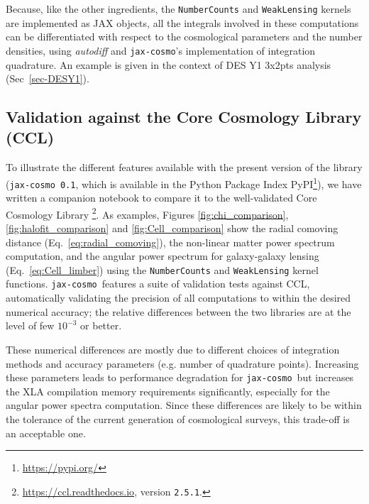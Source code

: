 \documentclass[twocolumn,twocolappendix,nofootinbib,iop]{openjournal}
\newcommand{\nblink}[1]{\href{https://github.com/DifferentiableUniverseInitiative/jax-cosmo-paper/blob/master/notebooks/#1.ipynb}{\faFileCodeO}}
\newcommand{\FrL}[1]{{\color{cyan}FL: #1}}
\newcommand{\jaxcosmo}{\texttt{jax-cosmo}}
\begin{document}


Because, like the other ingredients, the \texttt{NumberCounts} and \texttt{WeakLensing} kernels are implemented as JAX objects, all the integrals involved in these computations can be differentiated with respect to the cosmological parameters and the number densities, using \textit{autodiff} and \jaxcosmo's implementation of integration quadrature. An example is given in the context of DES Y1 3x2pts analysis (Sec~\ref{sec-DESY1}).
%
\subsection{Validation against the Core Cosmology Library (CCL)}
%
To illustrate the different features available with the present version of the library (\jaxcosmo\ \texttt{0.1}, which is available in the Python Package Index PyPI\footnote{\url{https://pypi.org/}}), we have written a  companion notebook \nblink{CCL_comparison} to compare it to the well-validated  Core Cosmology Library \citep{2019ApJS..242....2C}\footnote{\url{https://ccl.readthedocs.io}, version \texttt{2.5.1}.}. As examples, Figures \ref{fig:chi_comparison},
\ref{fig:halofit_comparison} and \ref{fig:Cell_comparison}
show the radial comoving distance (Eq.~\ref{eq:radial_comoving}), the non-linear matter power spectrum computation, and the angular power spectrum for galaxy-galaxy lensing (Eq.~\ref{eq:Cell_limber}) using the \texttt{NumberCounts} and \texttt{WeakLensing} kernel functions. \jaxcosmo\ features a suite of validation tests against CCL, automatically validating the precision of all computations to within the desired numerical accuracy; the relative differences between the two libraries are at the level of few $10^{-3}$ or better.

These numerical differences are mostly due to different choices of integration methods and accuracy parameters (e.g. number of quadrature points). Increasing these parameters leads to performance degradation for \jaxcosmo\, but increases the XLA compilation memory requirements significantly, especially for the angular power spectra computation. Since these differences are likely to be within the tolerance of the current generation of cosmological surveys, this trade-off is an acceptable one.
\end{document}
